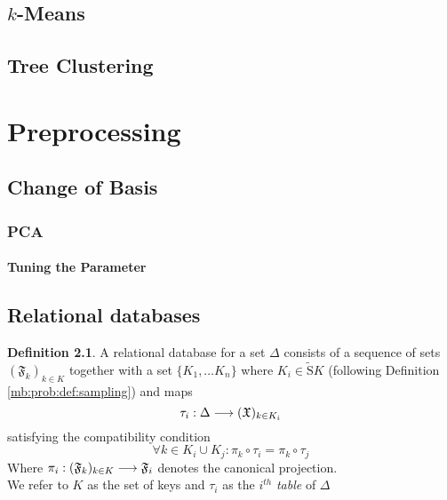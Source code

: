 \documentclass{book}
\theoremstyle{plain}
\theoremstyle{definition}
\newtheorem{definition}[corollary]{Definition}
\newcommand{\draw}[1]{\widetilde{\textrm{S}} #1}
\newcommand{\f}[1]{\mathfrak{#1}}
\newcommand{\mor}{\longrightarrow}
\begin{document}
\chapter{$k$-Means}

\chapter{Tree Clustering}

\part{Preprocessing}

\chapter{Change of Basis}

\section{PCA}

\subsection{Tuning the Parameter}


\chapter{Relational databases}

\begin{definition}
A relational database for  a set $\Delta$ consists of a sequence of sets $(\f{F}_k)_{k \in K}$ together with a set $\{K_1,\ldots K_n\}$ where $K_i \in \draw{K}$ (following Definition \ref{mb:prob:def:sampling}) and maps
\[
\tau_i: \Delta \mor (\frak{X})_{k \in K_i}
\]
satisfying the compatibility condition
\[
\forall k \in K_i\cup K_j: \pi_k\circ \tau_i = \pi_k\circ \tau_j
\]
Where $\pi_i: (\frak{F}_k)_{k \in K}\mor \frak{F}_i$ denotes the canonical projection.\\
We refer to $K$ as the set of keys and $\tau_i$ as the $i^{th}$ \emph{table} of $\Delta$
\end{definition}



\end{document}
